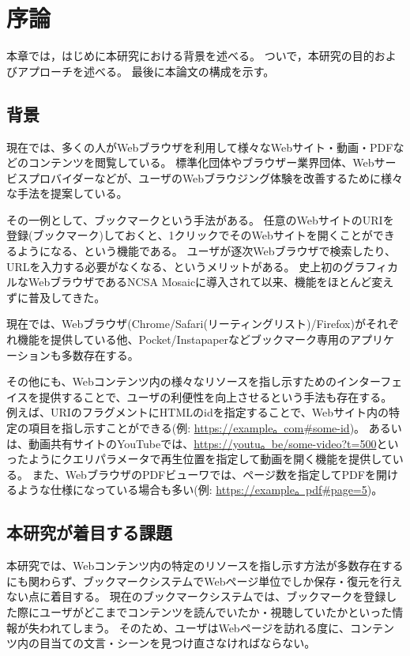 \chapter{序論}
\label{chap:introduction}

本章では，はじめに本研究における背景を述べる。
ついで，本研究の目的およびアプローチを述べる。
最後に本論文の構成を示す。

\section{背景}
\label{section:background}

現在では、多くの人がWebブラウザを利用して様々なWebサイト・動画・PDFなどのコンテンツを閲覧している。
標準化団体やブラウザー業界団体、Webサービスプロバイダーなどが、ユーザのWebブラウジング体験を改善するために様々な手法を提案している。

その一例として、ブックマークという手法がある。
任意のWebサイトのURIを登録(ブックマーク)しておくと、1クリックでそのWebサイトを開くことができるようになる、という機能である。
ユーザが逐次Webブラウザで検索したり、URLを入力する必要がなくなる、というメリットがある。
史上初のグラフィカルなWebブラウザであるNCSA Mosaic\cite{ncsa-mosaic}に導入されて以来、機能をほとんど変えずに普及してきた。

現在では、Webブラウザ(Chrome\cite{chrome}/Safari\cite{safari}(リーティングリスト)/Firefox\cite{firefox})がそれぞれ機能を提供している他、Pocket\cite{pocket}/Instapaper\cite{instapaper}などブックマーク専用のアプリケーションも多数存在する。

その他にも、Webコンテンツ内の様々なリソースを指し示すためのインターフェイスを提供することで、ユーザの利便性を向上させるという手法も存在する。
例えば、URIのフラグメントにHTMLのidを指定することで、Webサイト内の特定の項目を指し示すことができる(例: \url{https://example。com#some-id})。
あるいは、動画共有サイトのYouTube\cite{youtube}では、\url{https://youtu。be/some-video?t=500}といったようにクエリパラメータで再生位置を指定して動画を開く機能を提供している。
また、WebブラウザのPDFビューワでは、ページ数を指定してPDFを開けるような仕様になっている場合も多い\cite{browser-pdf-viewer-pdf-page-num-function}(例: \url{https://example。pdf#page=5})。

\section{本研究が着目する課題}
本研究では、Webコンテンツ内の特定のリソースを指し示す方法が多数存在するにも関わらず、ブックマークシステムでWebページ単位でしか保存・復元を行えない点に着目する。
現在のブックマークシステムでは、ブックマークを登録した際にユーザがどこまでコンテンツを読んでいたか・視聴していたかといった情報が失われてしまう。
そのため、ユーザはWebページを訪れる度に、コンテンツ内の目当ての文言・シーンを見つけ直さなければならない。

